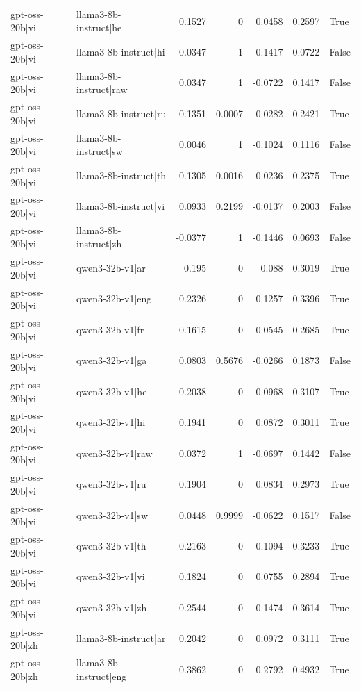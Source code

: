 \begin{table}
\begin{tabular}{l l r r r r l}
gpt-oss-20b|vi & llama3-8b-instruct|he & 0.1527 & 0 & 0.0458 & 0.2597 & True \\
gpt-oss-20b|vi & llama3-8b-instruct|hi & -0.0347 & 1 & -0.1417 & 0.0722 & False \\
gpt-oss-20b|vi & llama3-8b-instruct|raw & 0.0347 & 1 & -0.0722 & 0.1417 & False \\
gpt-oss-20b|vi & llama3-8b-instruct|ru & 0.1351 & 0.0007 & 0.0282 & 0.2421 & True \\
gpt-oss-20b|vi & llama3-8b-instruct|sw & 0.0046 & 1 & -0.1024 & 0.1116 & False \\
gpt-oss-20b|vi & llama3-8b-instruct|th & 0.1305 & 0.0016 & 0.0236 & 0.2375 & True \\
gpt-oss-20b|vi & llama3-8b-instruct|vi & 0.0933 & 0.2199 & -0.0137 & 0.2003 & False \\
gpt-oss-20b|vi & llama3-8b-instruct|zh & -0.0377 & 1 & -0.1446 & 0.0693 & False \\
gpt-oss-20b|vi & qwen3-32b-v1|ar & 0.195 & 0 & 0.088 & 0.3019 & True \\
gpt-oss-20b|vi & qwen3-32b-v1|eng & 0.2326 & 0 & 0.1257 & 0.3396 & True \\
gpt-oss-20b|vi & qwen3-32b-v1|fr & 0.1615 & 0 & 0.0545 & 0.2685 & True \\
gpt-oss-20b|vi & qwen3-32b-v1|ga & 0.0803 & 0.5676 & -0.0266 & 0.1873 & False \\
gpt-oss-20b|vi & qwen3-32b-v1|he & 0.2038 & 0 & 0.0968 & 0.3107 & True \\
gpt-oss-20b|vi & qwen3-32b-v1|hi & 0.1941 & 0 & 0.0872 & 0.3011 & True \\
gpt-oss-20b|vi & qwen3-32b-v1|raw & 0.0372 & 1 & -0.0697 & 0.1442 & False \\
gpt-oss-20b|vi & qwen3-32b-v1|ru & 0.1904 & 0 & 0.0834 & 0.2973 & True \\
gpt-oss-20b|vi & qwen3-32b-v1|sw & 0.0448 & 0.9999 & -0.0622 & 0.1517 & False \\
gpt-oss-20b|vi & qwen3-32b-v1|th & 0.2163 & 0 & 0.1094 & 0.3233 & True \\
gpt-oss-20b|vi & qwen3-32b-v1|vi & 0.1824 & 0 & 0.0755 & 0.2894 & True \\
gpt-oss-20b|vi & qwen3-32b-v1|zh & 0.2544 & 0 & 0.1474 & 0.3614 & True \\
gpt-oss-20b|zh & llama3-8b-instruct|ar & 0.2042 & 0 & 0.0972 & 0.3111 & True \\
gpt-oss-20b|zh & llama3-8b-instruct|eng & 0.3862 & 0 & 0.2792 & 0.4932 & True \\

\end{tabular}
\end{table}

